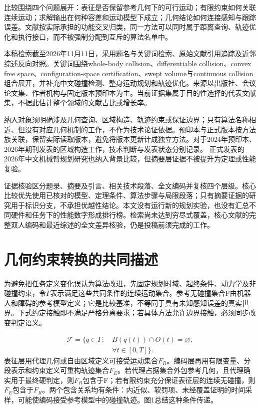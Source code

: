\documentclass{aas}
\begin{document}
比较围绕四个问题展开：表征是否保留参考几何下的可行运动；有限约束如何关联连续运动；求解输出在何种容差和运动模型下成立；几何结论如何连接感知与跟踪误差。文献按实际承担的功能交叉归类，同一方法可以同时属于距离查询、轨迹优化和执行接口，而不被强制分配到互斥的算法名单中。

本稿检索截至2026年11月11日，采用题名与关键词检索、原始文献引用追踪及近邻综述反向对照。关键词围绕whole-body collision、differentiable collision、convex free space、configuration-space certification、swept volume与continuous collision组合展开，并补充中文碰撞检测、整身运动规划和轨迹优化。来源以出版社、会议论文集、作者机构与固定版本预印本为主。当前证据集属于目的性选择的代表文献集，不据此估计整个领域的文献占比或增长率。

纳入对象须明确涉及几何查询、区域构造、轨迹约束或保证边界；只有算法名称相近、但没有对应几何机制的工作，不作为技术论证依据。预印本与正式版本按方法族关联，保留实际读取版本，避免将版本更新计成独立方法。对于2024年预印本、2026年期刊发表的区域构造工作，技术判断与发表状态分别记录。\cite{R15} 正式发表的2026年中文机械臂规划研究也纳入背景比较，但摘要层证据不被提升为定理或性能复验。\cite{R31}

证据核验区分题录、摘要及引言、相关技术段落、全文编码并复核四个层级。核心比较优先使用已核对的模型、定理条件、算法步骤与局限段落；只有摘要证据的研究用于标识分支，不承担优越性结论。本文没有运行新的规划实验，也没有汇总不同硬件和任务下的性能数字形成排行榜。检索尚未达到穷尽式覆盖，核心文献的完整双人编码和最近综述的全文差异核验，仍是投稿前须完成的工作。

\section{几何约束转换的共同描述}
为避免把任务定义变化误认为算法改进，先固定规划时域、起终条件、动力学及非碰撞约束，令$\Gamma$表示满足这些共同条件的连续运动集合。参考无碰撞集合F由机器人和障碍的参考模型定义；它是比较基准，不等同于具有未知感知误差的真实世界。下式约定接触即不满足严格分离要求；若具体方法允许边界接触，必须同步改变判定语义。

\begin{equation}
\begin{aligned}\mathcal F=\{q\in\Gamma:\ &B(q(t))\cap O(t)=\varnothing,\\&\forall t\in[0,T]\}.\end{aligned}
\end{equation}
表征层用代理几何或自由区域定义可接受运动集合$F_R$。编码层再用有限变量、分段表示和约束定义可重构轨迹集合$F_E$。若代理占据集合外包参考几何，且代理确实用于最终硬判定，则$F_R$包含于F；若有限约束充分保证表征层的连续无碰撞，则$F_E$包含于$F_R$。两个包含关系均有条件：内近似、软罚项、未经覆盖证明的时间采样，可能使编码接受参考模型中的碰撞轨迹。图1总结这种条件传递。
\end{document}
